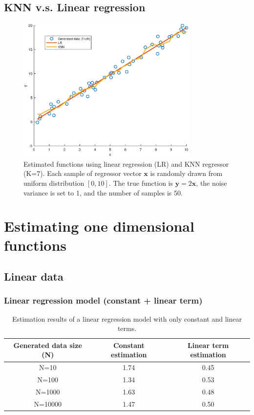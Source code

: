\documentclass[]{article}
\begin{document}
\subsection{KNN v.s. Linear regression}
\begin{figure}[H]
	\caption{Estimated functions using linear regression (LR) and KNN regressor (K=7). Each sample of regressor vector $\mathbf{x}$ is randomly drawn from uniform distribution $[0,10]$. The true function is $\mathbf{y}=2\mathbf{x}$, the noise variance is set to 1, and the number of samples is 50.}
	\centering
	\includegraphics[width=0.8\textwidth]{project2b}
\end{figure}

\section{Estimating one dimensional functions}

\subsection{Linear data}

\subsubsection{Linear regression model (constant + linear term)}
\begin{table}[H]
	\centering
	\caption{Estimation results of a linear regression model with only constant and linear terms.}
	\label{tab:linear}
	\begin{tabular}{@{}ccc@{}}
		\toprule
		Generated data size (N) & Constant estimation & Linear term estimation \\ \midrule
		N=10        & 1.74                & 0.45                   \\
		N=100       & 1.34                & 0.53                   \\
		N=1000      & 1.63                & 0.48                   \\
		N=10000     & 1.47                & 0.50                   \\ \bottomrule
	\end{tabular}
\end{table}
\end{document}

